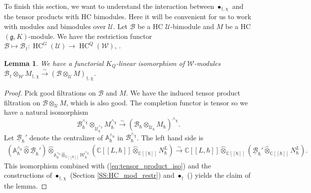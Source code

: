 \documentclass[12pt]{amsart}
\newcommand{\C}{\mathbb{C}}
\newcommand{\A}{\mathcal{A}}
\newcommand{\B}{\mathcal{B}}
\newcommand{\U}{\mathcal{U}}
\newcommand{\g}{\mathfrak{g}}
\newcommand{\Orb}{\mathbb{O}}
\newcommand{\Walg}{\mathcal{W}}
\newcommand{\HC}{\operatorname{HC}}
\newcommand{\wHC}{\operatorname{wHC}}
\newcommand{\Weyl}{\mathbb{A}}
\newtheorem{Lem}[Thm]{Lemma}
\theoremstyle{definition}
\newtheorem{Rem}[Thm]{Remark}
\numberwithin{equation}{section}
\begin{document}

To finish this section, we want to understand the interaction between $\bullet_{\dagger,\chi}$
and the tensor products with HC bimodules. Here it will be convenient for us to work
with modules and bimodules over $\U$. Let $\B$ be a HC $\U$-bimodule and $M$ be a HC
$(\g,K)$-module. We have the restriction functor $\B\mapsto \B_\dagger: \HC^G(\U)
\rightarrow \HC^Q(\Walg)$, \cite[Section 3.4]{HC}.

\begin{Lem}\label{Lem:restriction_compatibilty}
We have a functorial $K_Q$-linear isomorphism of $\Walg$-modules $\B_\dagger\otimes_\Walg M_{\dagger,\chi}\xrightarrow{\sim}(\B\otimes_\U M)_{\dagger,\chi}$.
\end{Lem}
\begin{proof}
Pick good filtrations on $\B$ and $M$. We have the induced tensor product filtration on
$\B\otimes_{\U} M$, which is also good. The completion functor is tensor so we have a
natural isomorphism
\begin{equation}\label{eq:tensor_product_iso}\B_\hbar^{\wedge_\chi}\otimes_{\U_\hbar^{\wedge_\chi}}M_\hbar^{\wedge_\chi}
\xrightarrow{\sim} (\B_\hbar\otimes_{\U_\hbar}M_\hbar)^{\wedge_\chi}.
\end{equation}
Let
$\underline{\B}_\hbar'$ denote the centralizer of $\Weyl_\hbar^{\wedge_0}$
in $\B_\hbar^{\wedge_\chi}$. The left hand
side is
\begin{align*}
\left(\Weyl_\hbar^{\wedge_0}\widehat{\otimes}\underline{\B}_\hbar'\right)
\widehat{\otimes}_{\Weyl_\hbar^{\wedge_0}\widehat{\otimes}_{\C[[\hbar]]}
\Walg_\hbar^{\wedge_\chi}}(\C[[L,\hbar]]\widehat{\otimes}_{\C[[\hbar]]}N_\hbar^L)
\xrightarrow{\sim} \C[[L,\hbar]]\widehat{\otimes}_{\C[[\hbar]]}
(\underline{\B}_\hbar'\widehat{\otimes}_{\C[[\hbar]]}N_\hbar^L).\end{align*}
This isomorphism combined with (\ref{eq:tensor_product_iso}) and the constructions
of $\bullet_{\dagger,\chi}$ (Section \ref{SS:HC_mod_restr}) and
$\bullet_\dagger$ (\cite[Section 3.4]{HC}) yields
the claim of the lemma.
\end{proof}
\end{document}
